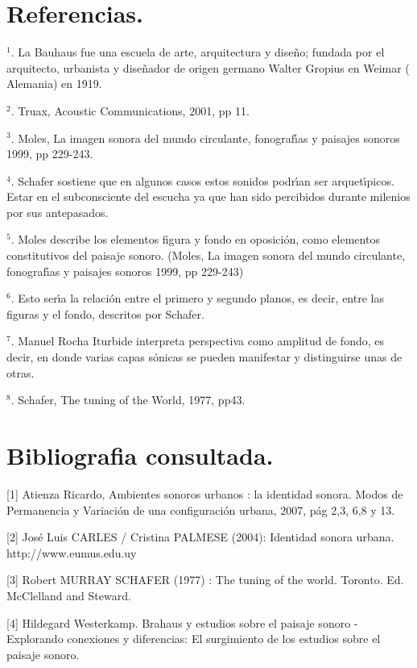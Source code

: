 \section*{Referencias.}

$^{1}$. La Bauhaus fue una escuela de arte, arquitectura y dise\~{n}o; fundada
por el arquitecto, urbanista y dise\~{n}ador de origen germano Walter Gropius
en Weimar ( Alemania) en 1919.

$^{2}$. Truax, Acoustic Communications, 2001, pp 11.

$^{3}$. Moles, La imagen sonora del mundo circulante, fonograf\'{\i}as y
paisajes sonoros 1999, pp 229-243.

$^{4}$. Schafer sostiene que en algunos casos estos sonidos podr\'{\i}an ser
arquet\'{\i}picos. Estar en el subconsciente del escucha ya que han sido
percibidos durante milenios por sus antepasados.

$^{5}$. Moles describe los elementos figura y fondo en oposici\'{o}n, como
elementos constitutivos del paisaje sonoro. (Moles, La imagen sonora del mundo
circulante, fonograf\'{\i}as y paisajes sonoros 1999, pp 229-243)

$^{6}$. Esto ser\'{\i}a la relaci\'{o}n entre el primero y segundo planos, es
decir, entre las figuras y el fondo, descritos por Schafer.

$^{7}$. Manuel Rocha Iturbide interpreta perspectiva como amplitud de fondo,
es decir, en donde varias capas s\'{o}nicas se pueden manifestar y
distinguirse unas de otras.

$^{8}$. Schafer, The tuning of the World, 1977, pp43.

\section*{Bibliografia consultada.}

[1] Atienza Ricardo, Ambientes sonoros urbanos : la identidad sonora. Modos de
Permanencia y Variaci\'{o}n de una configuraci\'{o}n urbana, 2007, p\'{a}g
2,3, 6,8 y 13.

[2] Jos\'{e} Luis CARLES / Cristina PALMESE (2004): Identidad sonora urbana. http://www.eumus.edu.uy

[3] Robert MURRAY SCHAFER (1977) : The tuning of the world. Toronto. Ed.
McClelland and Steward.

[4] Hildegard Westerkamp. Brahaus y estudios sobre el paisaje sonoro -
Explorando conexiones y diferencias: El surgimiento de los estudios sobre el
paisaje sonoro.

